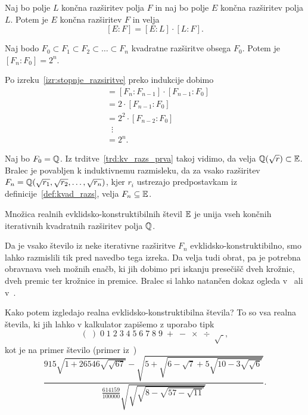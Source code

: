 \begin{izrek}
    \label{izr:stopnje_razsiritve}
    Naj bo polje $L$ končna razširitev polja $F$ in naj bo polje $E$ končna razširitev polja $L$. Potem je $E$ končna razširitev $F$ in velja
    $$ [E : F] = [E : L] \cdot[L : F].$$
\end{izrek}
\begin{posledica}
    \label{posl:kvadr_razs}
    Naj bodo $F_0 \subset F_1 \subset F_2 \subset \ldots \subset F_n$ kvadratne razširitve obsega $F_0$. Potem je $[F_n : F_0] = 2^n$.
\end{posledica}
\begin{dokaz}
    Po izreku~\ref{izr:stopnje_razsiritve} preko indukcije dobimo
    \begin{align*}
        [F_n : F_0] &= [F_n : F_{n-1}] \cdot [F_{n-1} : F_0] \\
        &= 2 \cdot [F_{n-1} : F_0] \\
        &= 2^2 \cdot [F_{n-2} : F_0] \\
        & \; \; \vdots \\
        &= 2^n.
    \end{align*}
\end{dokaz}

Naj bo $F_0 = \mathbb Q$. Iz trditve~\ref{trd:kv_razs_prva} takoj vidimo, da velja $\mathbb Q(\sqrt{r}) \subset \mathbb E$. Bralec je povabljen k induktivnemu razmisleku, da za vsako razširitev $ F_n = \mathbb Q(\sqrt{r_1}, \sqrt{r_2}, \ldots, \sqrt{r_n})$, kjer $r_i$ ustrezajo predpostavkam iz definicije~\ref{def:kvad_razs}, velja $F_n \subseteq \mathbb E$.

\begin{izrek}
    Množica realnih evklidsko-konstruktibilnih števil $\mathbb E$ je unija vseh končnih iterativnih kvadratnih razširitev polja $\mathbb Q$.
\end{izrek}

Da je vsako število iz neke iterativne razširitve $F_n$ evklidsko-konstruktibilno, smo lahko razmislili tik pred navedbo tega izreka. Da velja tudi obrat, pa je potrebna obravnava vseh možnih enačb, ki jih dobimo pri iskanju presečišč dveh krožnic, dveh premic ter krožnice in premice. Bralec si lahko natančen dokaz ogleda v~\cite[str.\ 38--39]{geometricconstructions} ali v~\cite{jerman1998}.

Kako potem izgledajo realna evklidsko-konstruktibilna števila? To so vsa realna števila, ki jih lahko v kalkulator zapišemo z uporabo tipk
$$ (\;)\;0\;1\;2\;3\;4\;5\;6\;7\;8\;9\;+\;-\;\times\;\div\;\sqrt{\;},$$
kot je na primer število (primer iz~\cite[str.\ 37]{geometricconstructions})
$$ \frac{
    915 \sqrt{1 + 26546 \sqrt{\sqrt{67}}} -
    \sqrt{5 + \sqrt{6 - \sqrt{7} + 5\sqrt{10 - 3\sqrt{\sqrt{6}}}}}
}{
    \frac{614159}{100000} \sqrt{\sqrt{\sqrt{8 - \sqrt{57 - \sqrt{11}}}}}
}.
$$

